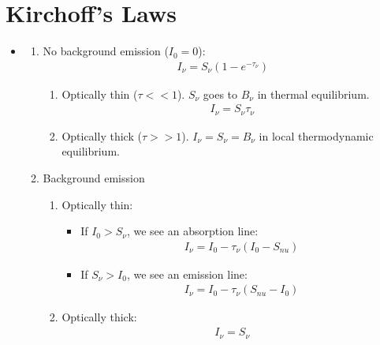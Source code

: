 \section{Kirchoff's Laws}
\begin{itemize}
    \item{
    \begin{enumerate}
        \item{No background emission ($I_{0} = 0$):
        \begin{align}
        I_{\nu} = S_{\nu} (1 - e^{-\tau_{\nu}})
        \end{align}
        \begin{enumerate}
            \item{Optically thin ($\tau << 1$). $S_{\nu}$ goes to $B_{\nu}$ in thermal equilibrium.
            \begin{align}
            I_{\nu} = S_{\nu}\tau_{\nu}
            \end{align}
            }
            \item{Optically thick ($\tau >> 1$). $I_{\nu} = S_{\nu} = B_{\nu}$ in local thermodynamic equilibrium.}
        \end{enumerate}
        }
        \item{Background emission
        \begin{enumerate}
            \item{Optically thin:
            \begin{itemize}
                \item{If $I_{0} > S_{\nu}$, we see an absorption line:
                \begin{align}
                    I_{\nu} = I_{0} - \tau_{\nu} (I_{0} - S_{nu})
                \end{align}
                }
                \item{If $S_{\nu} > I_{0}$, we see an emission line:
                \begin{align}
                    I_{\nu} = I_{0} - \tau_{\nu} (S_{nu} - I_{0})
                \end{align}
                }
            \end{itemize}
            }
            \item{Optically thick:
            \begin{align}
                I_{\nu} = S_{\nu}
            \end{align}
            }
        \end{enumerate}
        }
    \end{enumerate}
    }
\end{itemize}

